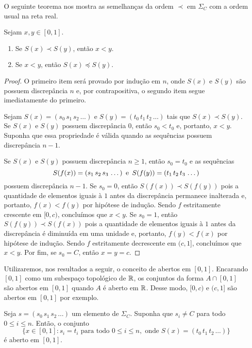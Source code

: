 O seguinte teorema nos mostra as semelhanças da ordem $\prec$ em $\Sigma_C$ com a ordem usual na reta real.

\begin{theorem}
\label{teo1}
Sejam $x, y \in [0, 1]$.
\begin{enumerate}
\item Se $S(x) \prec S(y)$, então $x < y$.
\item Se $x < y$, então $S(x) \preceq S(y)$.
\end{enumerate}
\end{theorem}

\begin{proof}
O primeiro item será provado por indução em $n$, onde $S(x)$ e $S(y)$ são possuem discrepância $n$ e, por contrapositiva, o segundo item segue imediatamente do primeiro.

Sejam $S(x) = (s_0\, s_1\, s_2\, \dots)$ e $S(y) = (t_0\, t_1\, t_2\, \dots)$ tais que $S(x) \prec S(y)$. Se $S(x)$ e $S(y)$ possuem discrepância $0$, então $s_0 < t_0$ e, portanto, $x < y$. Suponha que essa propriedade é válida quando as sequências possuem discrepância $n-1$.

Se $S(x)$ e $S(y)$ possuem discrepância $n \geq 1$, então $s_0 = t_0$ e as sequências 
$$S(f(x)) = (s_1\, s_2\, s_3\, \dots) \textrm{\, e \,} S(f(y)) = (t_1\, t_2\, t_3\, \dots)$$
possuem discrepância $n-1$. Se $s_0 = 0$, então $S(f(x)) \prec S(f(y))$ pois a quantidade de elementos iguais à $1$ antes da discrepância permanece inalterada e, portanto, $f(x) < f(y)$ por hipótese de indução. Sendo $f$ estritamente crescente em $[0, c)$, concluímos que $x < y$. Se $s_0 = 1$, então $S(f(y)) \prec S(f(x))$ pois a quantidade de elementos iguais à $1$ antes da discrepância é diminuída em uma unidade e, portanto, $f(y) < f(x)$ por hipótese de indução. Sendo $f$ estritamente decrescente em $(c, 1]$, concluímos que $x < y$. Por fim, se $s_0 = C$, então $x = y = c$.
\end{proof}

Utilizaremos, nos resultados a seguir, o conceito de abertos em $[0, 1]$. Encarando $[0, 1]$ como um subespaço topológico de $\mathbb{R}$, os conjuntos da forma $A \cap [0, 1]$ são abertos em $[0, 1]$ quando $A$ é aberto em $\mathbb{R}$. Desse modo, $[0, c)$ e $(c, 1]$ são abertos em $[0, 1]$ por exemplo.

\begin{lemma}
Seja $s = (s_0\, s_1\, s_2\, \dots)$ um elemento de $\Sigma_C$. Suponha que $s_i \neq C$ para todo $0 \leq i \leq n$. Então, o conjunto
$$\{ x \in [0, 1] : s_i = t_i \textrm{ para todo } 0 \leq i \leq n, \text{ onde } S(x) = (t_0\, t_1\, t_2\, \dots) \}$$
é aberto em $[0, 1]$.
\end{lemma}

